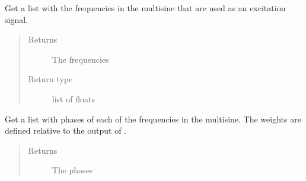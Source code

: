\documentclass[letterpaper,10pt,english]{sphinxmanual}
\begin{document}
\begin{fulllineitems}
\begin{fulllineitems}
\begin{quote}
\begin{description}
\end{description}\end{quote}

\end{fulllineitems}


\begin{fulllineitems}
\label{\detokenize{index:TiePieLCR_settings.TiePieLCR_settings.get_multisine_crest_factor}}
\end{fulllineitems}


\begin{fulllineitems}
\label{\detokenize{index:TiePieLCR_settings.TiePieLCR_settings.get_multisine_freqs}}
\sphinxAtStartPar
Get a list with the frequencies in the multisine that are used as an excitation signal.
\begin{quote}\begin{description}
\item[{Returns}] \leavevmode
\sphinxAtStartPar
The frequencies

\item[{Return type}] \leavevmode
\sphinxAtStartPar
list of floats

\end{description}\end{quote}

\end{fulllineitems}


\begin{fulllineitems}
\label{\detokenize{index:TiePieLCR_settings.TiePieLCR_settings.get_multisine_phases}}
\sphinxAtStartPar
Get a list with phases of each of the frequencies in the multisine. The weights are defined relative to the output of  .
\begin{quote}\begin{description}
\item[{Returns}] \leavevmode
\sphinxAtStartPar
The phases


\end{description}
\end{quote}
\end{fulllineitems}
\end{fulllineitems}
\end{document}
